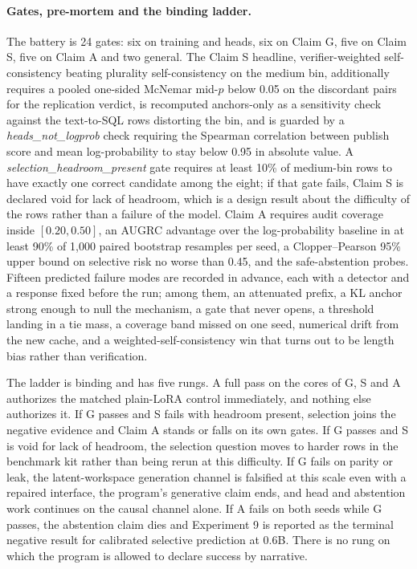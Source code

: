 \documentclass[10pt,a4paper]{article}
\begin{document}
\paragraph{Gates, pre-mortem and the binding ladder.}
The battery is 24 gates: six on training and heads, six on Claim G, five on
Claim S, five on Claim A and two general. The Claim S headline,
verifier-weighted self-consistency beating plurality self-consistency on the
medium bin, additionally requires a pooled one-sided McNemar mid-$p$ below
0.05 on the discordant pairs for the replication verdict, is recomputed
anchors-only as a sensitivity check against the text-to-SQL rows distorting
the bin, and is guarded by a \emph{heads\_not\_logprob} check requiring the
Spearman correlation between publish score and mean log-probability to stay
below 0.95 in absolute value. A \emph{selection\_headroom\_present} gate
requires at least 10\% of medium-bin rows to have exactly one correct
candidate among the eight; if that gate fails, Claim S is declared void for
lack of headroom, which is a design result about the difficulty of the rows
rather than a failure of the model. Claim A requires audit coverage inside
$[0.20, 0.50]$, an AUGRC advantage over the log-probability baseline in at
least 90\% of 1{,}000 paired bootstrap resamples per seed, a Clopper--Pearson
95\% upper bound on selective risk no worse than 0.45, and the safe-abstention
probes. Fifteen predicted failure modes are recorded in advance, each with a
detector and a response fixed before the run; among them, an attenuated
prefix, a KL anchor strong enough to null the mechanism, a gate that never
opens, a threshold landing in a tie mass, a coverage band missed on one seed,
numerical drift from the new cache, and a weighted-self-consistency win that
turns out to be length bias rather than verification.

The ladder is binding and has five rungs. A full pass on the cores of G, S
and A authorizes the matched plain-LoRA control immediately, and nothing else
authorizes it. If G passes and S fails with headroom present, selection joins
the negative evidence and Claim A stands or falls on its own gates. If G
passes and S is void for lack of headroom, the selection question moves to
harder rows in the benchmark kit rather than being rerun at this difficulty.
If G fails on parity or leak, the latent-workspace generation channel is
falsified at this scale even with a repaired interface, the program's
generative claim ends, and head and abstention work continues on the causal
channel alone. If A fails on both seeds while G passes, the abstention claim
dies and Experiment 9 is reported as the terminal negative result for calibrated
selective prediction at 0.6B. There is no rung on which the program is
allowed to declare success by narrative.
\end{document}
